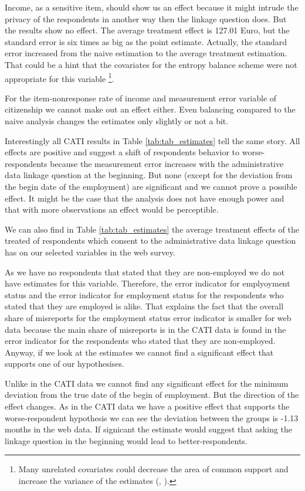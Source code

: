 Income, as a sensitive item, should show us an effect because it might intrude the privacy of the respondents in another way then the linkage question does. But the results show no effect. The average treatment effect is 127.01 Euro, but the standard error is six times as big as the point estimate. Actually, the standard error increased from the naive estimation to the average treatment estimation. That could be a hint that the covariates for the entropy balance scheme were not appropriate for this variable \footnote{Many unrelated covariates could decrease the area of common support and increase the variance of the estimates (\cite{Brysonetal02}, \cite{Augurzkyetal00}).}.



For the item-nonresponse rate of income and  measurement error variable of citizenship we cannot make out an effect either. Even balancing compared to the naive analysis changes the estimates only slightly or not a bit.

Interestingly all CATI results in Table \ref{tab:tab_estimates} tell the same story. All effects are positive and suggest a shift of respondents behavior to worse-respondents because the measurement error increases with the administrative data linkage question at the beginning. But none (except for the deviation from the begin date of the employment) are significant and we cannot prove a possible effect. It might be the case that the analysis does not have enough power and that with more observations an effect would be perceptible.

We can also find in Table \ref{tab:tab_estimates} the average treatment effects of the treated of respondents which consent to the administrative data linkage question has on our selected variables in the web survey.

As we have no respondents that stated that they are non-employed we do not have estimates for this variable. Therefore, the error indicator for emplyoyment status and the error indicator for employment status for the respondents who stated that they are employed is alike. That explains the fact that the overall share of misreports for the employment status error indicator is smaller for web data because the main share of misreports is in the CATI data is found in the error indicator for the respondents who stated that they are non-employed. Anyway, if we look at the estimates we cannot find a significant effect that supports one of our hypothesises.

Unlike in the CATI data we cannot find any significant effect for the minimum deviation from the true date of the begin of employment. But the direction of the effect changes. As in the CATI data we have a positive effect that supports the worse-respondent hypothesis we can see the deviation between the groups is -1.13 months in the web data. If signicant the estimate would suggest that asking the linkage question in the beginning would lead to better-respondents.

